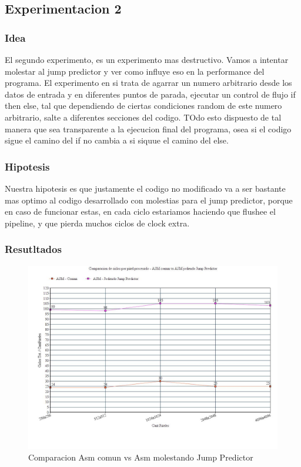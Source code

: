 	

\subsection{Experimentacion 2}	

\subsubsection{Idea}
	El segundo experimento, es un experimento mas destructivo. Vamos a intentar molestar al jump predictor y ver como influye eso en la  performance del programa. 
	El experimento en si trata de agarrar un numero arbitrario desde los datos de entrada y en diferentes puntos de parada, ejecutar un control de flujo if then else, tal que dependiendo de ciertas condiciones random de este numero arbitrario, salte  a diferentes secciones del codigo. TOdo esto dispuesto de tal manera que sea transparente a la ejecucion final del programa, osea si el codigo sigue el camino del if no cambia a si siquue el camino del else.

\subsubsection{Hipotesis}
	Nuestra hipotesis es que justamente el codigo no modificado va a ser bastante mas optimo al codigo desarrollado con molestias para el jump predictor, porque en caso de funcionar estas, en cada ciclo estariamos haciendo que flushee el pipeline, y que pierda muchos ciclos de clock extra.
	
\subsubsection{Resutltados}

\medskip\begin{figure}[h!]
\centering
\captionsetup{justification=centering}
	\includegraphics[width = 15 cm, height = 8 cm]{imagenes/JumpPredictor.jpg}
	\caption[center]{Comparacion Asm comun vs Asm molestando Jump Predictor}
\end{figure}

